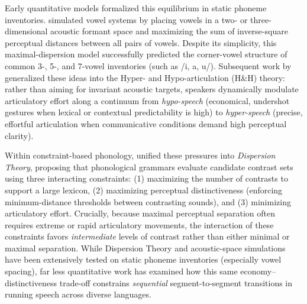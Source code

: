 \documentclass{interact}
\begin{document}
Early quantitative models formalized this equilibrium in static phoneme inventories. \citet{liljencrants1972} simulated vowel systems by placing vowels in a two- or three-dimensional acoustic formant space and maximizing the sum of inverse-square perceptual distances between all pairs of vowels. Despite its simplicity, this maximal-dispersion model successfully predicted the corner-vowel structure of common \mbox{3-}, \mbox{5-}, and \mbox{7-vowel} inventories (such as /i, a, u/). Subsequent work by \citet{lindblom1990} generalized these ideas into the Hyper- and Hypo-articulation (H\&H) theory: rather than aiming for invariant acoustic targets, speakers dynamically modulate articulatory effort along a continuum from \emph{hypo-speech} (economical, undershot gestures when lexical or contextual predictability is high) to \emph{hyper-speech} (precise, effortful articulation when communicative conditions demand high perceptual clarity).

Within constraint-based phonology, \citet{flemming2004} unified these pressures into \emph{Dispersion Theory}, proposing that phonological grammars evaluate candidate contrast sets using three interacting constraints: (1) maximizing the number of contrasts to support a large lexicon, (2) maximizing perceptual distinctiveness (enforcing minimum-distance thresholds between contrasting sounds), and (3) minimizing articulatory effort. Crucially, because maximal perceptual separation often requires extreme or rapid articulatory movements, the interaction of these constraints favors \emph{intermediate} levels of contrast rather than either minimal or maximal separation. While Dispersion Theory and acoustic-space simulations have been extensively tested on static phoneme inventories (especially vowel spacing), far less quantitative work has examined how this same economy--distinctiveness trade-off constrains \emph{sequential} segment-to-segment transitions in running speech across diverse languages.
\end{document}

